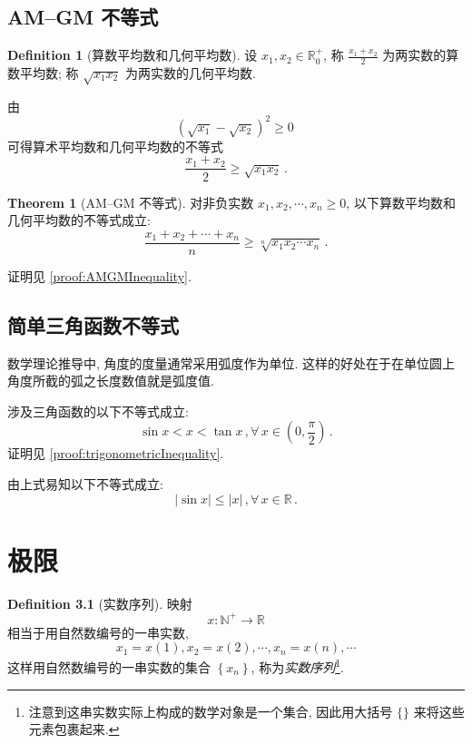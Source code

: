 \documentclass{book}
\newcommand{\Any}{\forall\,}
\newcommand{\set}[1]{\left\{#1\right\}}
\newcommand{\abs}[1]{\left\lvert #1 \right\rvert}
\newcommand{\R}{\mathbb{R}}
\newcommand{\N}{\mathbb{N}}
\renewcommand{\ge}{\geqslant}
\renewcommand{\le}{\leqslant}
\numberwithin{equation}{section}
\numberwithin{figure}{section}
\theoremstyle{definition}
\newtheorem{definition}{Definition}
\newtheorem{theorem}{Theorem}[section]
\begin{document}
\section{AM--GM 不等式}
\begin{definition}[算数平均数和几何平均数]
  设 $x_1,x_2\in\R_0^+$, 称
  $
    \frac{x_1+x_2}{2}
    $
  为两实数的算数平均数;
  称
  $
    \sqrt{x_1x_2}
    $
  为两实数的几何平均数.
\end{definition}

由
\begin{equation*}
  \left( \sqrt{x_1}-\sqrt{x_2} \right)^2\geqslant 0\,
\end{equation*}
可得算术平均数和几何平均数的不等式
\begin{equation}
  \frac{x_1+x_2}{2}\ge \sqrt{x_1x_2}\,.
\end{equation}

\begin{theorem}[AM--GM 不等式]
  对非负实数 $x_1,x_2,\cdots,x_n\ge 0$, 以下算数平均数和几何平均数的不等式成立:
  \begin{equation}
    \frac{x_1+x_2+\cdots+x_n}{n}\ge\sqrt[n]{x_1x_2\cdots x_n}\,.
  \end{equation}
\end{theorem}

证明见 \cref{proof:AMGMInequality}.

\section{简单三角函数不等式}
数学理论推导中, 角度的度量通常采用弧度作为单位. 这样的好处在于在单位圆上角度所截的弧之长度数值就是弧度值.

涉及三角函数的以下不等式成立:
\begin{equation}
  \sin x<x<\tan x\,,\Any x\in \left( 0,\frac{\pi}{2} \right)\,.
\end{equation}
证明见 \cref{proof:trigonometricInequality}.

由上式易知以下不等式成立:
\begin{equation}
  \abs{\sin x}\le\abs{x}\,,\Any x\in\R\,.
\end{equation}

\chapter{极限}
\begin{definition}[实数序列]
  映射
  \begin{equation*}
    x:\N^+\to \R
  \end{equation*}
  相当于用自然数编号的一串实数,
  \begin{equation*}
    x_1=x(1),x_2=x(2),\cdots,x_n=x(n),\cdots
  \end{equation*}
  这样用自然数编号的一串实数的集合 $\set{x_n}$, 称为\emph{实数序列}\footnote{注意到这串实数实际上构成的数学对象是一个集合, 因此用大括号 $\{ \}$ 来将这些元素包裹起来.}.
\end{definition}
\end{document}
